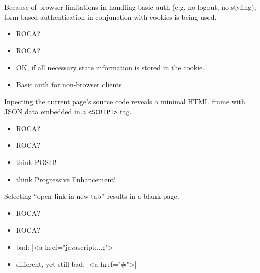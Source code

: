\documentclass{beamer}
\newcommand{\rocaok}{\ding{51}}
\newcommand{\rocafail}{\ding{55}}
\begin{document}
\begin{frame}
  Because of browser limitations in handling basic auth (e.g. no logout, no styling),
  form-based authentication in conjunction with cookies is being used.

  \vspace{0.3cm}
  \begin{itemize}
    \item<1|only@1>[\Large $\square$] \Large ROCA?
    \item<2|only@2>[\Large \rocaok] \Large ROCA?
    \item<2> OK, if all necessary state information is stored in the cookie.
    \item<2> Basic auth for non-browser clients
  \end{itemize}

\end{frame}

\begin{frame}
  Inpecting the current page's source code reveals a minimal HTML frame with
  JSON data embedded in a \texttt{<SCRIPT>} tag.

  \vspace{0.3cm}
  \begin{itemize}
    \item<1|only@1>[\Large $\square$] \Large ROCA?
    \item<2|only@2>[\Large \rocafail] \Large ROCA?
    \item<2> think POSH!
    \item<2> think Progressive Enhancement!
  \end{itemize}

\end{frame}

\begin{frame}[fragile]
  Selecting ``open link in new tab'' results in a blank page.

  \vspace{0.3cm}
  \begin{itemize}
    \item<1|only@1>[\Large $\square$] \Large ROCA?
    \item<2|only@2>[\Large \rocafail] \Large ROCA?
    \item<2> bad: |<a href="javascript:...;">|
    \item<2> different, yet still bad: |<a href="#">|
  \end{itemize}
\end{frame}
\end{document}

